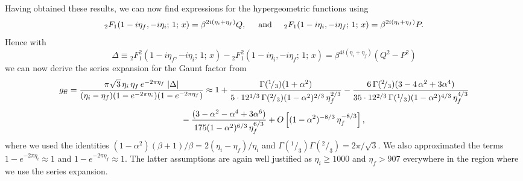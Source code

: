 \documentclass[useAMS,usenatbib]{mn2e}
\def\rfrac#1#2{{}^{#1}\!/_{#2}}
\begin{document}
Having obtained these results, we can now find expressions for the hypergeometric functions using
\[ {}_2F_1( 1 - i \eta_f, -i \eta_i; \, 1; \, x ) = \beta^{2i(\eta_i + \eta_f)} Q, \hspace*{5mm} {\rm and} \hspace*{5mm}
 {}_2F_1( 1 - i \eta_i, -i \eta_f; \, 1; \, x ) = \beta^{2i(\eta_i + \eta_f)} P. \]
Hence with
\[ \Delta \equiv {}_2F_1^2( 1 - i \eta_f, -i \eta_i; \, 1; \, x ) - {}_2F_1^2( 1 - i \eta_i, -i \eta_f; \, 1; \, x ) =
\beta^{4i(\eta_i + \eta_f)}( Q^2 - P^2 ) \]
we can now derive the series expansion for the Gaunt factor from
\[
g_{\rm ff} = \frac{\pi \sqrt{3} \, \eta_i \, \eta_f \, e^{-2\pi\eta_f}\;|\Delta|}{(\eta_i-\eta_f)(1-e^{-2\pi\eta_i})(1-e^{-2\pi\eta_f})} \approx
1 + \frac{\Gamma(\rfrac{1}{3})(1 + \alpha^2)}{5 \cdot 12^{1/3} \, \Gamma(\rfrac{2}{3})(1 - \alpha^2)^{2/3} \, \eta_f^{2/3}} -
\frac{6 \, \Gamma(\rfrac{2}{3})(3 - 4\,\alpha^2 + 3\alpha^4)}
{35 \cdot 12^{2/3} \, \Gamma(\rfrac{1}{3})(1 - \alpha^2)^{4/3} \, \eta_f^{4/3}}
\]
\begin{equation}
\phantom{g_{\rm ff} =} - \frac{(3 - \alpha^2 - \alpha^4 + 3\alpha^6)}
{175(1 - \alpha^2)^{6/3} \, \eta_f^{6/3}} +
O\left[(1 - \alpha^2)^{-8/3} \, \eta_f^{-8/3}\right],
\end{equation}
where we used the identities $(1-\alpha^2)(\beta+1)/\beta = 2(\eta_i -
\eta_f)/\eta_i$ and $\Gamma(\rfrac{1}{3})\Gamma(\rfrac{2}{3}) =
2\pi/\sqrt{3}$. We also approximated the terms $1-e^{-2\pi\eta_i} \approx 1$
and $1-e^{-2\pi\eta_f} \approx 1$. The latter assumptions are again well
justified as $\eta_i \geq 1000$ and $\eta_f > 907$ everywhere in the region
where we use the series expansion.

\label{lastpage}
\end{document}
